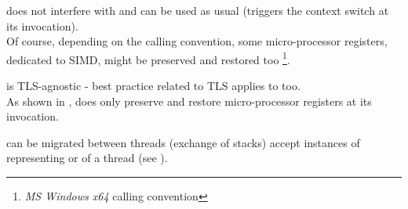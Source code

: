 

does not interfere with \cc and can be used as usual (\cc triggers the context
switch at its invocation).\\
Of course, depending on the calling convention, some micro-processor registers,
dedicated to SIMD, might be preserved and restored too
\footnote{\emph{MS Windows x64} calling convention}.



\cc is TLS-agnostic - best practice related to TLS applies to \cc too.\\
As shown in , \cc does only  preserve and restore
micro-processor registers at its invocation.



\cont can be migrated between threads (exchange of stacks) accept instances of
\cont representing \main or \entryfn of a thread (see ).
